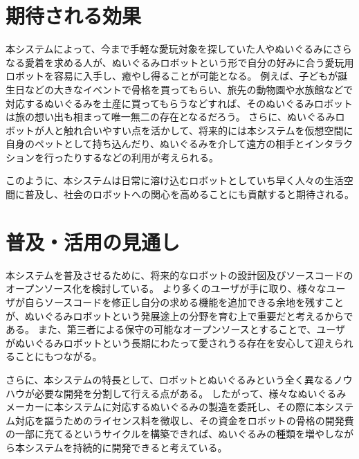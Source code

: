 \documentclass[uplatex,a4paper,12pt]{jsarticle}
\begin{document}
\section{期待される効果}
本システムによって、今まで手軽な愛玩対象を探していた人やぬいぐるみにさらなる愛着を求める人が、ぬいぐるみロボットという形で自分の好みに合う愛玩用ロボットを容易に入手し、癒やし得ることが可能となる。
例えば、子どもが誕生日などの大きなイベントで骨格を買ってもらい、旅先の動物園や水族館などで対応するぬいぐるみを土産に買ってもらうなどすれば、そのぬいぐるみロボットは旅の想い出も相まって唯一無二の存在となるだろう。
さらに、ぬいぐるみロボットが人と触れ合いやすい点を活かして、将来的には本システムを仮想空間に自身のペットとして持ち込んだり、ぬいぐるみを介して遠方の相手とインタラクションを行ったりするなどの利用が考えられる。

このように、本システムは日常に溶け込むロボットとしていち早く人々の生活空間に普及し、社会のロボットへの関心を高めることにも貢献すると期待される。

\section{普及・活用の見通し}

本システムを普及させるために、将来的なロボットの設計図及びソースコードのオープンソース化を検討している。
より多くのユーザが手に取り、様々なユーザが自らソースコードを修正し自分の求める機能を追加できる余地を残すことが、ぬいぐるみロボットという発展途上の分野を育む上で重要だと考えるからである。
また、第三者による保守の可能なオープンソースとすることで、ユーザがぬいぐるみロボットという長期にわたって愛されうる存在を安心して迎えられることにもつながる。

さらに、本システムの特長として、ロボットとぬいぐるみという全く異なるノウハウが必要な開発を分割して行える点がある。
したがって、様々なぬいぐるみメーカーに本システムに対応するぬいぐるみの製造を委託し、その際に本システム対応を謳うためのライセンス料を徴収し、その資金をロボットの骨格の開発費の一部に充てるというサイクルを構築できれば、ぬいぐるみの種類を増やしながら本システムを持続的に開発できると考えている。
\end{document}
